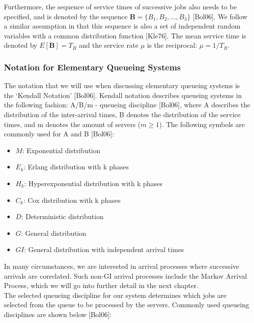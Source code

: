 \documentclass[a4paper,11pt,titlepage]{article}
\begin{document}
Furthermore, the sequence of service times of successive jobs also needs to be specified, and is denoted by the sequence $\mathbf{B} = \{B_1, B_2, ... , B_3 \}$ [Bol06]. We follow a similar assumption in that this sequence is also a set of independent random variables with a common distribution function [Kle76]. The mean service time is denoted by $E[\mathbf{B}] = T_B$ and the service rate $\mu$ is the reciprocal: $\mu = 1/T_B$. 

\subsubsection{Notation for Elementary Queueing Systems}

The notation that we will use when discussing elementary queueing systems is the `Kendall Notation' [Bol06]. Kendall notation describes queueing systems in the following fashion: A/B/m - queueing discipline [Bol06], where A describes the distribution of the inter-arrival times, B denotes the distribution of the service times, and m denotes the amount of servers ($m \geq 1$). The following symbols are commonly used for A and B [Bol06]: 

\begin{itemize}
    \item $M$: Exponential distribution
    \item $E_k$: Erlang distribution with k phases
    \item $H_k$: Hyperexponential distribution with k phases
    \item $C_k$: Cox distribution with k phases 
    \item $D$: Deterministic distribution 
    \item $G$: General distribution 
    \item $GI$: General distribution with independent arrival times 
\end{itemize}

In many circumstances, we are interested in arrival processes where successive arrivals are correlated. Such non-GI arrival processes include the Markov Arrival Process, which we will go into further detail in the next chapter. \\

The selected queueing discipline for our system determines which jobs are selected from the queue to be processed by the servers. Commonly used queueing disciplines are shown below [Bol06]: 
\end{document}
